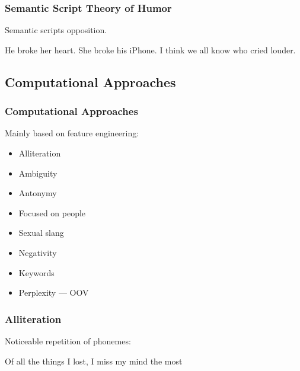 \begin{frame}
    \frametitle{Semantic Script Theory of Humor}

    Semantic scripts opposition.

    \begin{example}
        He broke her heart. She broke his iPhone. I think we all know who cried louder.
    \end{example}
\end{frame}


\subsection{Computational Approaches}
\begin{frame}
    \frametitle{Computational Approaches}

    Mainly based on feature engineering:

    \begin{itemize}
        \item Alliteration
        \item Ambiguity
        \item Antonymy
        \item Focused on people
        \item Sexual slang
        \item Negativity
        \item Keywords
        \item Perplexity --- OOV
    \end{itemize}
\end{frame}

\begin{frame}
    \frametitle{Alliteration}

    Noticeable repetition of phonemes:

    \begin{example}
        Of all the things I lost, I miss my mind the most
    \end{example}
\end{frame}

